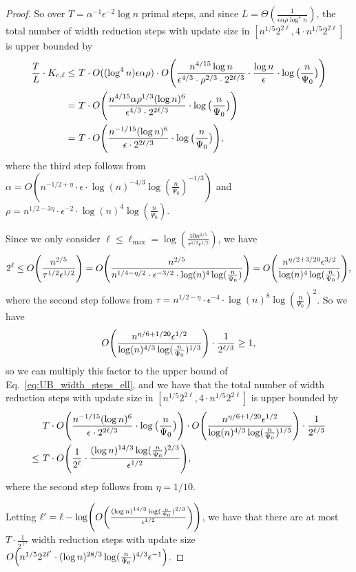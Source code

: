\documentclass[11pt]{article}
\let\originalleft\left
\let\originalright\right
\renewcommand{\left}{\mathopen{}\mathclose\bgroup\originalleft}
\renewcommand{\right}{\aftergroup\egroup\originalright}
\begin{document}
\begin{proof}
So over $T = \alpha^{-1}\epsilon^{-2}\log n$ primal steps, and since $L = \Theta(\frac{1}{\epsilon \alpha \rho \log^4 n})$, the total number of width reduction steps with update size in $[n^{1/5} 2^{2\ell}, 4 \cdot n^{1/5} 2^{2\ell}]$ is upper bounded by
\begin{align}\label{eq:UB_width_steps_ell}
\frac{T}{L} \cdot K_{c,\ell} \leq &~ T \cdot O((\log^4 n) \epsilon \alpha \rho) \cdot O\left(\frac{n^{4/15} \log n}{\epsilon^{4/3} \cdot \rho^{2/3} \cdot 2^{2\ell/3}} \cdot \frac{\log n}{\epsilon} \cdot \log\big(\frac{n}{\Psi_0}\big)\right) \notag \\
= &~ T \cdot O\left(\frac{n^{4/15} \alpha \rho^{1/3} (\log n)^6}{\epsilon^{4/3} \cdot 2^{2\ell/3}} \cdot \log\big(\frac{n}{\Psi_0}\big)\right) \notag \\
= &~ T \cdot O\left(\frac{n^{-1/15} (\log n)^6}{\epsilon \cdot 2^{2\ell/3}} \cdot \log\big(\frac{n}{\Psi_0}\big)\right),
\end{align}
where the third step follows from $\alpha = O(n^{-1/2+\eta} \cdot \epsilon \cdot \log(n)^{-4/3} \log(\frac{n}{\Psi_0})^{-1/3})$ and $\rho = n^{1/2-3\eta} \cdot \epsilon^{-2} \cdot \log(n)^4 \log(\frac{n}{\Psi_0})$.

Since we only consider $\ell \leq \ell_{\max} = \log(\frac{10 n^{2/5}}{\tau^{1/2} \epsilon^{1/2}})$, we have
\begin{align*}
2^{\ell} \leq O\left(\frac{n^{2/5}}{\tau^{1/2} \epsilon^{1/2}}\right)
= O\left(\frac{n^{2/5}}{n^{1/4-\eta/2} \cdot \epsilon^{-3/2} \cdot \log(n)^4 \log(\frac{n}{\Psi_0})}\right) 
= O\left(\frac{n^{\eta/2+3/20} \epsilon^{3/2}}{\log(n)^4 \log(\frac{n}{\Psi_0})}\right),
\end{align*}
where the second step follows from $\tau = n^{1/2-\eta} \cdot \epsilon^{-4} \cdot \log(n)^8 \log(\frac{n}{\Psi_0})^2$. So we have
\[
O\left(\frac{n^{\eta/6+1/20} \epsilon^{1/2}}{\log(n)^{4/3} \log(\frac{n}{\Psi_0})^{1/3}}\right) \cdot \frac{1}{2^{\ell/3}} \geq 1,
\]
so we can multiply this factor to the upper bound of Eq.~\eqref{eq:UB_width_steps_ell}, and we have that the total number of width reduction steps with update size in $[n^{1/5} 2^{2\ell}, 4 \cdot n^{1/5} 2^{2\ell}]$ is upper bounded by
\begin{align*}
&~ T \cdot O\left(\frac{n^{-1/15} (\log n)^6}{\epsilon \cdot 2^{2\ell/3}} \cdot \log\big(\frac{n}{\Psi_0}\big)\right) \cdot O\left(\frac{n^{\eta/6+1/20} \epsilon^{1/2}}{\log(n)^{4/3} \log(\frac{n}{\Psi_0})^{1/3}}\right) \cdot \frac{1}{2^{\ell/3}} \\
\leq &~ T \cdot O\left(\frac{1}{2^{\ell}} \cdot \frac{(\log n)^{14/3} \log(\frac{n}{\Psi_0})^{2/3}}{\epsilon^{1/2}}\right),
\end{align*}
where the second step follows from $\eta = 1/10$.

Letting $\ell' = \ell - \log\left(O\left(\frac{(\log n)^{14/3} \log(\frac{n}{\Psi_0})^{2/3}}{\epsilon^{1/2}}\right)\right)$, we have that there are at most $T \cdot \frac{1}{2^{\ell'}}$ width reduction steps with update size $O\left(n^{1/5} 2^{2 \ell'} \cdot (\log n)^{28/3} \log(\frac{n}{\Psi_0})^{4/3} \epsilon^{-1}\right)$.
\end{proof}
\end{document}
